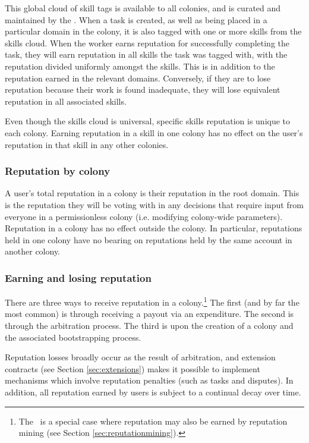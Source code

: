 This global cloud of skill tags is available to all colonies, and is curated and maintained by the \rc. When a task is created, as well as being placed in a particular domain in the colony, it is also tagged with one or more skills from the skills cloud. When the worker earns reputation for successfully completing the task, they will earn reputation in all skills the task was tagged with, with the reputation divided uniformly amongst the skills. This is in addition to the reputation earned in the relevant domains. Conversely, if they are to lose reputation because their work is found inadequate, they will lose equivalent reputation in all associated skills.

Even though the skills cloud is universal, specific skills reputation is unique to each colony. Earning reputation in a skill in one colony has no effect on the user's reputation in that skill in any other colonies.

\subsubsection*{Reputation by colony}\label{sec:rep-by-colony}

A user's total reputation in a colony is their reputation in the root domain. This is the reputation they will be voting with in any decisions that require input from everyone in a permissionless colony (i.e. modifying colony-wide parameters). Reputation in a colony has no effect outside the colony. In particular, reputations held in one colony have no bearing on reputations held by the same account in another colony.

\subsubsection{Earning and losing reputation}\label{sec:earning-losing-rep}

There are three ways to receive reputation in a colony.\footnote{The \rc\ is a special case where reputation may also be earned by reputation mining (see Section \ref{sec:reputationmining}).} The first (and by far the most common) is through receiving a payout via an expenditure. The second is through the arbitration process. The third is upon the creation of a colony and the associated bootstrapping process.

Reputation losses broadly occur as the result of arbitration, and extension contracts (see Section \ref{sec:extensions}) makes it possible to implement mechanisms which involve reputation penalties (such as tasks and disputes). In addition, all reputation earned by users is subject to a continual decay over time.


